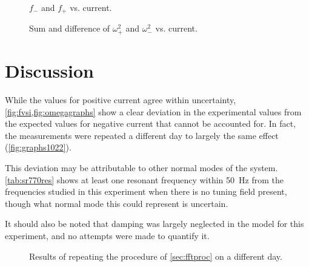 \documentclass{article}
\begin{document}
\begin{figure}
  \centering
  \def\svgwidth{\linewidth}
  
  \caption{$f_-$ and $f_+$ vs. current.}
  \label{fig:fvsi}
\end{figure}

\begin{figure}
  \centering
  \begin{subfigure}{.5\linewidth}
    \def\svgwidth{\linewidth}
    
  \end{subfigure}%
  \begin{subfigure}{.5\linewidth}
    \def\svgwidth{\linewidth}
    
  \end{subfigure}
  \caption{Sum and difference of $\omega_+^2$ and $\omega_-^2$ vs. current.}
  \label{fig:omegagraphs}
\end{figure}

\section{Discussion}
While the values for positive current agree within uncertainty, \cref{fig:fvsi,fig:omegagraphs} show a clear deviation in the experimental values from the expected values for negative current that cannot be accounted for. In fact, the measurements were repeated a different day to largely the same effect (\autoref{fig:graphs1022}).

This deviation may be attributable to other normal modes of the system. \autoref{tab:sr770res} shows at least one resonant frequency within \qty{50}{Hz} from the frequencies studied in this experiment when there is no tuning field present, though what normal mode this could represent is uncertain.

It should also be noted that damping was largely neglected in the model for this experiment, and no attempts were made to quantify it.




\begin{figure}
  \centering
  \begin{subfigure}{\linewidth}
	\def\svgwidth{\linewidth}
  
  \end{subfigure}
  \begin{subfigure}{.5\linewidth}
    \def\svgwidth{\linewidth}
    
  \end{subfigure}%
  \begin{subfigure}{.5\linewidth}
    \def\svgwidth{\linewidth}
    
  \end{subfigure}
  \caption{Results of repeating the procedure of \autoref{sec:fftproc} on a different day.}
  \label{fig:graphs1022}
\end{figure}
\end{document}
